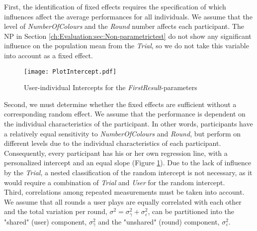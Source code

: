 First, the identification of  fixed effects requires the specification of which influences affect the average performances for all individuals.  We assume that the level of \textit{NumberOfColours} and the \textit{Round} number affects each participant.
The \acl{NP} in Section \ref{ch:Evaluation:sec:Non-parametrictest} do not show any significant influence on the population mean from the \textit{Trial}, so we do not take this variable into account as a fixed effect.
\begin{figure}[htbp] %
\begin{center} 
\texttt{[image: PlotIntercept.pdf]}
  \caption{User-individual Intercepts for the \textit{FirstResult}-parameters}
    \label{fig:Intercepts} 
\end{center}
\end{figure}

Second, we must determine whether the fixed effects are sufficient without a corresponding random effect. We assume that the performance is dependent on the individual characteristics of the participant. In other words, participants have a relatively equal sensitivity to \textit{NumberOfColours} and \textit{Round}, but perform on different levels due to the individual characteristics of each participant. Consequently, every participant has his or her own regression line, with a personalized intercept and an equal slope (Figure \ref{fig:Intercepts}). Due to the lack of influence by the \textit{Trial}, a nested classification of the random intercept is not necessary, as it would require a combination of \textit{Trial} and \textit{User} for the random intercept.\\
Third, correlations among repeated measurements must be taken into account. We assume that all rounds a user plays are equally correlated with each other and the total variation per round, $\sigma^{2} = \sigma^{2}_{\gamma} + \sigma^{2}_{\varepsilon}$, can be partitioned into the "shared" (user) component, $\sigma^{2}_{\gamma}$ and the "unshared" (round) component, $\sigma^{2}_{\varepsilon}$.

